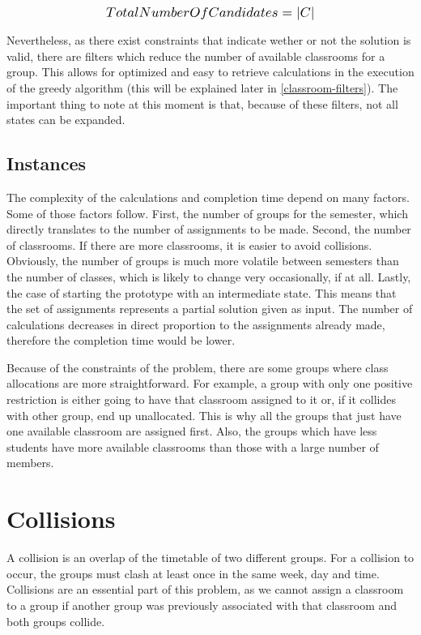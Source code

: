\begin{equation}
    \scalebox{1.2}{$TotalNumberOfCandidates = \left|C\right|$}
\end{equation}

Nevertheless, as there exist constraints that indicate wether or not the solution is valid, there are filters which reduce the number of available classrooms for a group. This allows for optimized and easy to retrieve calculations in the execution of the greedy algorithm (this will be explained later in \ref{classroom-filters}). The important thing to note at this moment is that, because of these filters, not all states can be expanded.

\subsection{Instances}

The complexity of the calculations and completion time depend on many factors. Some of those factors follow. First, the number of groups for the semester, which directly translates to the number of assignments to be made. Second, the number of classrooms. If there are more classrooms, it is easier to avoid collisions. Obviously, the number of groups is much more volatile between semesters than the number of classes, which is likely to change very occasionally, if at all. Lastly, the case of starting the prototype with an intermediate state. This means that the set of assignments represents a partial solution given as input. The number of calculations decreases in direct proportion to the assignments already made, therefore the completion time would be lower.

Because of the constraints of the problem, there are some groups where class allocations are more straightforward. For example, a group with only one positive restriction is either going to have that classroom assigned to it or, if it collides with other group, end up unallocated. This is why all the groups that just have one available classroom are assigned first. Also, the groups which have less students have more available classrooms than those with a large number of members.



\section{Collisions}

A collision is an overlap of the timetable of two different groups. For a collision to occur, the groups must clash at least once in the same week, day and time. Collisions are an essential part of this problem, as we cannot assign a classroom to a group if another group was previously associated with that classroom and both groups collide.


